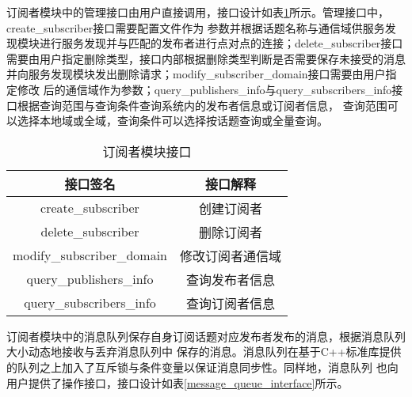 订阅者模块中的管理接口由用户直接调用，接口设计如表\ref{subscriber_interface}所示。管理接口中，create\_subscriber接口需要配置文件作为
参数并根据话题名称与通信域供服务发现模块进行服务发现并与匹配的发布者进行点对点的连接；delete\_subscriber接口
需要由用户指定删除类型，接口内部根据删除类型判断是否需要保存未接受的消息并向服务发现模块发出删除请求；modify\_subscriber\_domain接口需要由用户指定修改
后的通信域作为参数；query\_publishers\_info与query\_subscribers\_info接口根据查询范围与查询条件查询系统内的发布者信息或订阅者信息，
查询范围可以选择本地域或全域，查询条件可以选择按话题查询或全量查询。
\begin{table}[htb]
  \renewcommand\arraystretch{1.2}
  \centering\small
  \caption{订阅者模块接口}
  \label{subscriber_interface}
  \begin{tabular}{cc}
    \toprule
    接口签名 & 接口解释 \\
    \midrule
    create\_subscriber & 创建订阅者\\
    delete\_subscriber & 删除订阅者\\
    modify\_subscriber\_domain & 修改订阅者通信域\\
    query\_publishers\_info & 查询发布者信息\\
    query\_subscribers\_info & 查询订阅者信息\\
    \bottomrule
  \end{tabular}
\end{table}


订阅者模块中的消息队列保存自身订阅话题对应发布者发布的消息，根据消息队列大小动态地接收与丢弃消息队列中
保存的消息。消息队列在基于C++标准库提供的队列之上加入了互斥锁与条件变量以保证消息同步性。同样地，消息队列
也向用户提供了操作接口，接口设计如表\ref{message_queue_interface}所示。

